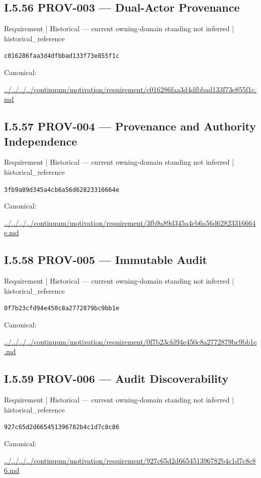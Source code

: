 \documentclass[10pt,a4paper]{article}
\begin{document}
\subsection*{I.5.56 PROV-003 — Dual-Actor Provenance}
\label{element-c016286faa3d4dfbbad133f73e855f1c}
{\small Requirement | Historical — current owning-domain standing not inferred | historical\_reference}\par
\texttt{c016286faa3d4dfbbad133f73e855f1c}\par
Canonical: \par
{\footnotesize\url{../../../../continuum/motivation/requirement/c016286faa3d4dfbbad133f73e855f1c.md}}\par
\subsection*{I.5.57 PROV-004 — Provenance and Authority Independence}
\label{element-3fb9a89d345a4cb6a56d62823316664e}
{\small Requirement | Historical — current owning-domain standing not inferred | historical\_reference}\par
\texttt{3fb9a89d345a4cb6a56d62823316664e}\par
Canonical: \par
{\footnotesize\url{../../../../continuum/motivation/requirement/3fb9a89d345a4cb6a56d62823316664e.md}}\par
\subsection*{I.5.58 PROV-005 — Immutable Audit}
\label{element-0f7b23cfd94e450c8a2772879bc9bb1e}
{\small Requirement | Historical — current owning-domain standing not inferred | historical\_reference}\par
\texttt{0f7b23cfd94e450c8a2772879bc9bb1e}\par
Canonical: \par
{\footnotesize\url{../../../../continuum/motivation/requirement/0f7b23cfd94e450c8a2772879bc9bb1e.md}}\par
\subsection*{I.5.59 PROV-006 — Audit Discoverability}
\label{element-927c65d2d665451396782b4c1d7c8c86}
{\small Requirement | Historical — current owning-domain standing not inferred | historical\_reference}\par
\texttt{927c65d2d665451396782b4c1d7c8c86}\par
Canonical: \par
{\footnotesize\url{../../../../continuum/motivation/requirement/927c65d2d665451396782b4c1d7c8c86.md}}\par
\end{document}
